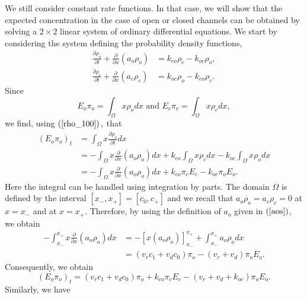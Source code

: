 We still consider constant rate functions. In that case, we will show that
the expected concentration in the case of open or closed channels can be obtained by 
solving a  $2\times2$ linear system of ordinary differential equations. We start by considering the system
defining the probability density functions,
\begin{align}
\frac{\partial\rho_{o}}{\partial t}+\frac{\partial}{\partial x}\left(
a_{o}\rho_{o}\right)   &  =k_{co}\rho_{c}-k_{oc}\rho_{o},\label{rho_100}\\
\frac{\partial\rho_{c}}{\partial t}+\frac{\partial}{\partial x}\left(
a_{c}\rho_{c}\right)   &  =k_{oc}\rho_{o}-k_{co}\rho_{c}.\label{rho_101}%
\end{align}
Since
\begin{equation}
E_{o}\pi_{o}=\int_{\Omega}x\rho_{o}dx\text{ and }E_{c}\pi_{c}=\int_{\Omega
}x\rho_{c}dx,
\end{equation}
we find, using $\left(  \ref{rho_100}\right)  ,$ that%
\begin{align}
\left(  E_{o}\pi_{o}\right)  _{t}  & =\int_{\Omega}x\frac{\partial\rho_{o}%
}{\partial t}dx\\
& =-\int_{\Omega}x\frac{\partial}{\partial x}\left(  a_{o}\rho_{o}\right)
dx+k_{co}\int_{\Omega}x\rho_{c}dx-k_{oc}\int_{\Omega}x\rho_{o}dx\\
& =-\int_{\Omega}x\frac{\partial}{\partial x}\left(  a_{o}\rho_{o}\right)
dx+k_{co}\pi_{c}E_{c}-k_{oc}\pi_{o}E_{o}.%
\end{align}
Here the integral can be handled using integration by parts. The domain
$\Omega$ is defined by the interval $\left[  x_{-},x_{+}\right] =[c_0,c_+] $ and we
recall that $a_{o}\rho_{o}=a_{c}\rho_{c}=0$ at $x=x_{-}$ and at $x=x_{+}.$
Therefore, by using the definition of $a_{o}$ given in $\left(  \ref{aos}\right)
$, we obtain
\begin{align}
-\int_{x_{-}}^{x_{+}}x\frac{\partial}{\partial x}\left(  a_{o}\rho_{o}\right)
dx &  =-\left[  x\left(  a_{o}\rho_{o}\right)  \right]  _{x_{-}}^{x_{+}}%
+\int_{x_{-}}^{x_{+}}a_{o}\rho_{o}dx\\
&  =\left(  v_{r}c_{1}+v_{d}c_{0}\right)  \pi_{o}-\left(  v_{r}+v_{d}\right)
\pi_{o}E_{o}.
\end{align}
Consequently, we obtain%
\begin{equation}
\left(  E_{o}\pi_{o}\right)  _{t}=\left(  v_{r}c_{1}+v_{d}c_{0}\right)
\pi_{o}+k_{co}\pi_{c}E_{c}-\left(  v_{r}+v_{d}+k_{oc}\right)  \pi_{o}E_{o}.
\end{equation}
Similarly, we have
